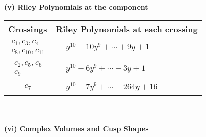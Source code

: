 \documentclass[1p]{elsarticle_modified}
\theoremstyle{definition}
\begin{document}
\newpage\renewcommand{\arraystretch}{1}
\flushleft \textbf{(v) Riley Polynomials at the component}\newline \\
\begin{tabular}{m{50pt}|m{274pt}}
Crossings & \hspace{64pt}Riley Polynomials at each crossing \\
\hline $$\begin{aligned}c_{1},c_{3},c_{4}\\c_{8},c_{10},c_{11}\end{aligned}$$&$\begin{aligned}
&y^{10}-10 y^9+\cdots+9 y+1
\end{aligned}$\\
\hline $$\begin{aligned}c_{2},c_{5},c_{6}\\c_{9}\end{aligned}$$&$\begin{aligned}
&y^{10}+6 y^9+\cdots-3 y+1
\end{aligned}$\\
\hline $$\begin{aligned}c_{7}\end{aligned}$$&$\begin{aligned}
&y^{10}-7 y^9+\cdots-264 y+16
\end{aligned}$\\
\hline
\end{tabular}\\~\\
\newpage\flushleft \textbf{(vi) Complex Volumes and Cusp Shapes}
\end{document}
